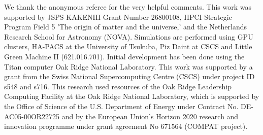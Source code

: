 \documentclass[a4paper,fleqn,usenatbib]{mnras}
\begin{document}
We thank the anonymous referee for the very helpful comments.
This work was supported by JSPS KAKENHI Grant Number 26800108, 
HPCI Strategic Program Field 5 'The origin of matter and the universe,' 
and the Netherlands Research School for Astronomy (NOVA).
Simulations are performed using GPU clusters, HA-PACS at the
University of Tsukuba, Piz Daint at CSCS and Little Green Machine II
(621.016.701). Initial development has been done using the Titan
computer Oak Ridge National Laboratory.  This work was supported by a
grant from the Swiss National Supercomputing Centre (CSCS) under
project ID s548 and s716.  This research used resources of the Oak Ridge
Leadership Computing Facility at the Oak Ridge National Laboratory,
which is supported by the Office of Science of the U.S. Department of
Energy under Contract No. DE-AC05-00OR22725 and by the European
Union's Horizon 2020 research and innovation programme under grant
agreement No 671564 (COMPAT project).
\appendix










\label{lastpage}
\end{document}
